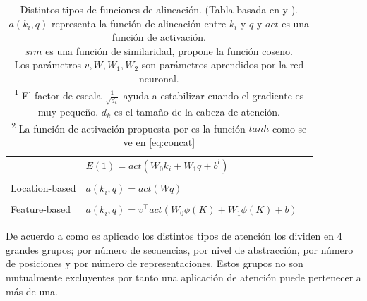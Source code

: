 \begin{table}[ht!]
\begin{center}
{\begin{tabular}{@{}lll@{}}
    & $E(1) = act(W_0k_i + W_1q + b^l)$ &  \\ \\
Location-based & $a(k_i, q) = act(W q)$ & \citeauthor{DBLP:journals/corr/LuongPM15} \\ \\
Feature-based & $a(k_i, q) = v^\top act(W_0 \phi(K) + W_1 \phi(K) + b)$ & \citeauthor{DBLP:journals/corr/abs-1810-10126} \\
\bottomrule
\end{tabular}}
\end{center}
\caption{Distintos tipos de funciones de alineación. (Tabla basada en \cite{DBLP:journals/corr/abs-1904-02874} y \cite{weng2018attention}). \\
$a(k_i, q)$ representa la función de alineación entre $k_i$ y $q$ y $act$ es una función de activación. \\
$sim$ es una función de similaridad, \citeauthor{DBLP:journals/corr/GravesWD14} propone la función coseno.\\
Los parámetros $v, W, W_1, W_2$ son parámetros aprendidos por la red neuronal.\\
\textsuperscript{1} El factor de escala $\frac{1}{\sqrt{d_k}}$ ayuda a estabilizar cuando el
gradiente es muy pequeño. $d_k$ es el tamaño de la cabeza de atención.\\
\textsuperscript{2} La función de activación propuesta por \citeauthor{bahdanau2016neural} es la función $tanh$ como se ve en \ref{eq:concat} \\
\label{Tab:att}}
\end{table}

De acuerdo a como es aplicado los distintos tipos de atención \citeauthor{DBLP:journals/corr/abs-1904-02874}
los dividen en 4 grandes grupos; por número de secuencias, por nivel de abstracción, por número de
posiciones y por número de representaciones. Estos grupos no son mutualmente excluyentes por tanto
una aplicación de atención puede pertenecer a más de una.

